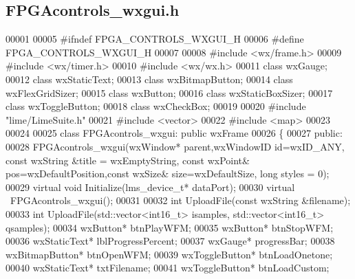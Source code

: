 \subsection{F\+P\+G\+Acontrols\+\_\+wxgui.\+h}
\label{FPGAcontrols__wxgui_8h_source}

\begin{DoxyCode}
00001 
00005 \textcolor{preprocessor}{#ifndef FPGA\_CONTROLS\_WXGUI\_H}
00006 \textcolor{preprocessor}{#define FPGA\_CONTROLS\_WXGUI\_H}
00007 
00008 \textcolor{preprocessor}{#include <wx/frame.h>}
00009 \textcolor{preprocessor}{#include <wx/timer.h>}
00010 \textcolor{preprocessor}{#include <wx/wx.h>}
00011 \textcolor{keyword}{class }wxGauge;
00012 \textcolor{keyword}{class }wxStaticText;
00013 \textcolor{keyword}{class }wxBitmapButton;
00014 \textcolor{keyword}{class }wxFlexGridSizer;
00015 \textcolor{keyword}{class }wxButton;
00016 \textcolor{keyword}{class }wxStaticBoxSizer;
00017 \textcolor{keyword}{class }wxToggleButton;
00018 \textcolor{keyword}{class }wxCheckBox;
00019 
00020 \textcolor{preprocessor}{#include "lime/LimeSuite.h"}
00021 \textcolor{preprocessor}{#include <vector>}
00022 \textcolor{preprocessor}{#include <map>}
00023 
00024 
00025 \textcolor{keyword}{class }FPGAcontrols_wxgui: \textcolor{keyword}{public} wxFrame
00026 \{
00027     \textcolor{keyword}{public}:
00028         FPGAcontrols_wxgui(wxWindow* parent,wxWindowID \textcolor{keywordtype}{id}=wxID\_ANY, \textcolor{keyword}{const} wxString &title = wxEmptyString, \textcolor{keyword}{
      const} wxPoint& pos=wxDefaultPosition,\textcolor{keyword}{const} wxSize& size=wxDefaultSize, \textcolor{keywordtype}{long} styles = 0);
00029         \textcolor{keyword}{virtual} \textcolor{keywordtype}{void} Initialize(lms_device_t* dataPort);
00030         \textcolor{keyword}{virtual} ~FPGAcontrols_wxgui();
00031 
00032         \textcolor{keywordtype}{int} UploadFile(\textcolor{keyword}{const} wxString &filename);
00033         \textcolor{keywordtype}{int} UploadFile(std::vector<int16\_t> isamples, std::vector<int16\_t> qsamples);
00034         wxButton* btnPlayWFM;
00035         wxButton* btnStopWFM;
00036         wxStaticText* lblProgressPercent;
00037         wxGauge* progressBar;
00038         wxBitmapButton* btnOpenWFM;
00039         wxToggleButton* btnLoadOnetone;
00040         wxStaticText* txtFilename;
00041         wxToggleButton* btnLoadCustom;

\end{DoxyCode}
